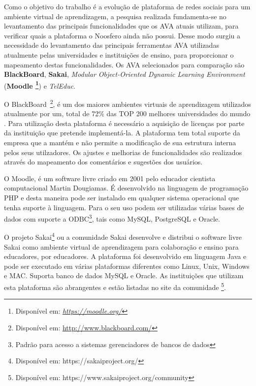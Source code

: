 Como o objetivo do trabalho é a evolução de plataforma de redes sociais para um ambiente virtual de aprendizagem, a pesquisa realizada fundamenta-se no levantamento das principais funcionalidades que os AVA atuais utilizam, para verificar quais a plataforma o Noosfero ainda não possui. Desse modo surgiu a necessidade do levantamento das principais ferramentas AVA utilizadas atualmente pelas universidades e instituições de ensino, para proporcionar o mapeamento destas funcionalidades.
%
Os AVA selecionados para comparação são \textbf{BlackBoard}, \textbf{Sakai}, \textit{Modular Object-Oriented Dynamic Learning Environment} (\textbf{Moodle \footnote{Disponível em: \textit{ \url{https://moodle.org/}}}}) e \textit{TelEduc}.

O BlackBoard~\footnote{Disponível em: \url{http://www.blackboard.com/}}, é um dos maiores ambientes virtuais de aprendizagem utilizados atualmente por um, total de 72\% das TOP 200 melhores universidades do mundo \cite{blackboard}. Para utilização desta plataforma é necessário a aquisição de licenças por parte da instituição que pretende implementá-la. A plataforma tem total suporte da empresa que a mantém e não permite a modificação de sua estrutura interna pelos seus utilzadores. Os ajustes e melhorias de funcionalidades são realizados através do mapeamento dos comentários e sugestões dos usuários.

O Moodle, é um software livre criado em 2001 pelo educador cientista computacional Martin Dougiamas. É desenvolvido na linguagem de programação PHP e desta maneira pode ser instalado em qualquer sistema operacional que tenha suporte à linguagem. Para o seu uso podem ser utilizadas várias bases de dados com suporte a ODBC\footnote{Padrão para acesso a sistemas gerenciadores de bancos de dados}, tais como MySQL, PostgreSQL e Oracle.

O projeto Sakai\footnote{Disponível em: https://sakaiproject.org/ } ou a comunidade Sakai desenvolve e distribui o software livre Sakai como ambiente virtual de aprendizagem para colaboração e ensino para educadores, por educadores. A plataforma foi desenvolvido em linguagem Java e pode ser executado em várias plataformas diferentes como Linux, Unix, Windows e MAC. Suporta banco de dados MySQL e Oracle. As instituições que utilizam esta plataforma são abrangentes e estão listadas no site da comunidade \footnote{Disponível em: https://www.sakaiproject.org/community}.

